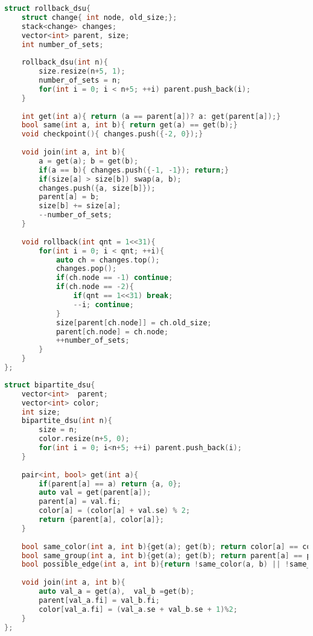 \documentclass[11pt, a4paper, twoside]{article}
\begin{document}
\begin{lstlisting}[language=C++]
struct rollback_dsu{
    struct change{ int node, old_size;};
    stack<change> changes;
    vector<int> parent, size;
    int number_of_sets;
    
    rollback_dsu(int n){
        size.resize(n+5, 1);
        number_of_sets = n;
        for(int i = 0; i < n+5; ++i) parent.push_back(i);
    }
    
    int get(int a){ return (a == parent[a])? a: get(parent[a]);}
    bool same(int a, int b){ return get(a) == get(b);}
    void checkpoint(){ changes.push({-2, 0});}
    
    void join(int a, int b){
        a = get(a); b = get(b);
        if(a == b){ changes.push({-1, -1}); return;}
        if(size[a] > size[b]) swap(a, b);
        changes.push({a, size[b]});
        parent[a] = b;
        size[b] += size[a];
        --number_of_sets;
    }
    
    void rollback(int qnt = 1<<31){
        for(int i = 0; i < qnt; ++i){
            auto ch = changes.top();
            changes.pop();
            if(ch.node == -1) continue;
            if(ch.node == -2){
                if(qnt == 1<<31) break; 
                --i; continue;
            }
            size[parent[ch.node]] = ch.old_size;
            parent[ch.node] = ch.node;
            ++number_of_sets;
        }
    }
};
\end{lstlisting}

\begin{lstlisting}[language=C++]
struct bipartite_dsu{
    vector<int>  parent;
    vector<int> color;
    int size;
    bipartite_dsu(int n){
        size = n;
        color.resize(n+5, 0);
        for(int i = 0; i<n+5; ++i) parent.push_back(i);
    }
    
    pair<int, bool> get(int a){
        if(parent[a] == a) return {a, 0};
        auto val = get(parent[a]);
        parent[a] = val.fi;
        color[a] = (color[a] + val.se) % 2;
        return {parent[a], color[a]};
    }
    
    bool same_color(int a, int b){get(a); get(b); return color[a] == color[b];}
    bool same_group(int a, int b){get(a); get(b); return parent[a] == parent[b];}
    bool possible_edge(int a, int b){return !same_color(a, b) || !same_group(a, b);}
    
    void join(int a, int b){
        auto val_a = get(a),  val_b =get(b);
        parent[val_a.fi] = val_b.fi;
        color[val_a.fi] = (val_a.se + val_b.se + 1)%2; 
    }
};
\end{lstlisting}
\end{document}
